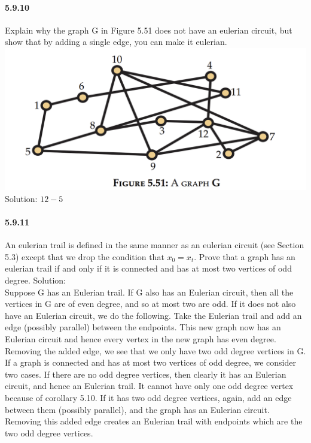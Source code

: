 \documentclass{article}
\begin{document}
\paragraph{5.9.10}
Explain why the graph G in Figure 5.51 does not have an eulerian circuit, but show that by adding a single edge, you can make it eulerian.\newline
\includegraphics{0076}\newline
Solution:\newline
$12-5$
\paragraph{5.9.11}
An eulerian trail is defined in the same manner as an eulerian circuit (see Section 5.3) except that we drop the condition that $x_0 = x_t$. Prove that a graph has an eulerian trail if and only if it is connected and has at most two vertices of odd degree.\newline
Solution:\\
Suppose G has an Eulerian trail. If G also has an Eulerian circuit, then all the vertices in G
are of even degree, and so at most two are odd. If it does not also have an Eulerian circuit,
we do the following. Take the Eulerian trail and add an edge (possibly parallel) between the
endpoints. This new graph now has an Eulerian circuit and hence every vertex in the new
graph has even degree. Removing the added edge, we see that we only have two odd degree
vertices in G.\\
If a graph is connected and has at most two vertices of odd degree, we consider two cases. If
there are no odd degree vertices, then clearly it has an Eulerian circuit, and hence an Eulerian
trail. It cannot have only one odd degree vertex because of corollary 5.10. If it has two odd
degree vertices, again, add an edge between them (possibly parallel), and the graph has an
Eulerian circuit. Removing this added edge creates an Eulerian trail with endpoints which
are the two odd degree vertices.
\end{document}
